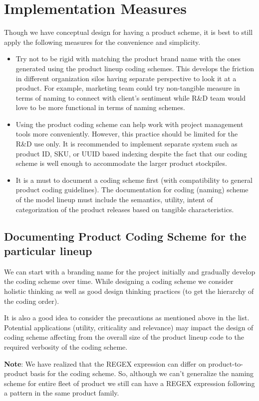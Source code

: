 \chapter{Implementation Measures}

Though we have conceptual design for having a product scheme, it is best to still apply the following measures for the convenience and simplicity.

\begin{itemize}
    \item Try not to be rigid with matching the product brand name with the ones generated using the product lineup coding schemes. This develops the friction in different organization silos having separate perspective to look it at a product. For example, marketing team could try non-tangible measure in terms of naming to connect with client's sentiment while R\&D team would love to be more functional in terms of naming schemes.

    \item Using the product coding scheme can help work with project management tools more conveniently. However, this practice should be limited for the R\&D use only. It is recommended to implement separate system such as product ID, SKU, or UUID based indexing despite the fact that our coding scheme is well enough to accommodate the larger product stockpiles.

    \item It is a must to document a coding scheme first (with compatibility to general product coding guidelines). The documentation for coding (naming) scheme of the model lineup must include the semantics, utility, intent of categorization of the product releases based on tangible characteristics.
\end{itemize}

\section[Documenting Coding Scheme]{Documenting Product Coding Scheme for the particular lineup}

We can start with a branding name for the project initially and gradually develop the coding scheme over time. While designing a coding scheme we consider holistic thinking as well as good design thinking practices (to get the hierarchy of the coding order).

It is also a good idea to consider the precautions as mentioned above in the list. Potential applications (utility, criticality and relevance) may impact the design of coding scheme affecting from the overall size of the product lineup code to the required verbosity of the coding scheme.

\textbf{Note}: We have realized that the REGEX expression can differ on product-to-product basis for the coding scheme. So, although we can't generalize the naming scheme for entire fleet of product we still can have a REGEX expression following a pattern in the same product family.

\clearpage